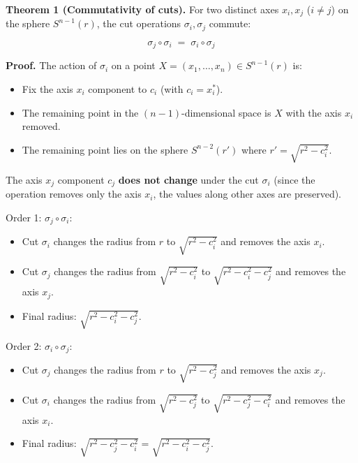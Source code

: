\documentclass[a4paper,11pt]{article}
\theoremstyle{definition}
\theoremstyle{remark}
\providecommand{\tightlist}{%
  \setlength{\itemsep}{0pt}\setlength{\parskip}{0pt}}
\begin{document}
\textbf{Theorem 1 (Commutativity of cuts).} For two distinct axes
\(x_i, x_j\) (\(i \neq j\)) on the sphere \(S^{n-1}(r)\), the cut
operations \(\sigma_i, \sigma_j\) commute:

\[
\sigma_j \circ \sigma_i \;=\; \sigma_i \circ \sigma_j
\]

\textbf{Proof.} The action of \(\sigma_i\) on a point
\(X = (x_1, \ldots, x_n) \in S^{n-1}(r)\) is:

\begin{itemize}
\tightlist
\item
  Fix the axis \(x_i\) component to \(c_i\) (with \(c_i = x_i^{*}\)).
\item
  The remaining point in the \((n-1)\)-dimensional space is \(X\) with
  the axis \(x_i\) removed.
\item
  The remaining point lies on the sphere \(S^{n-2}(r')\) where
  \(r' = \sqrt{r^2 - c_i^2}\).
\end{itemize}

The axis \(x_j\) component \(c_j\) \textbf{does not change} under the
cut \(\sigma_i\) (since the operation removes only the axis \(x_i\), the
values along other axes are preserved).

Order 1: \(\sigma_j \circ \sigma_i\):

\begin{itemize}
\tightlist
\item
  Cut \(\sigma_i\) changes the radius from \(r\) to
  \(\sqrt{r^2 - c_i^2}\) and removes the axis \(x_i\).
\item
  Cut \(\sigma_j\) changes the radius from \(\sqrt{r^2 - c_i^2}\) to
  \(\sqrt{r^2 - c_i^2 - c_j^2}\) and removes the axis \(x_j\).
\item
  Final radius: \(\sqrt{r^2 - c_i^2 - c_j^2}\).
\end{itemize}

Order 2: \(\sigma_i \circ \sigma_j\):

\begin{itemize}
\tightlist
\item
  Cut \(\sigma_j\) changes the radius from \(r\) to
  \(\sqrt{r^2 - c_j^2}\) and removes the axis \(x_j\).
\item
  Cut \(\sigma_i\) changes the radius from \(\sqrt{r^2 - c_j^2}\) to
  \(\sqrt{r^2 - c_j^2 - c_i^2}\) and removes the axis \(x_i\).
\item
  Final radius:
  \(\sqrt{r^2 - c_j^2 - c_i^2} = \sqrt{r^2 - c_i^2 - c_j^2}\).
\end{itemize}
\end{document}
